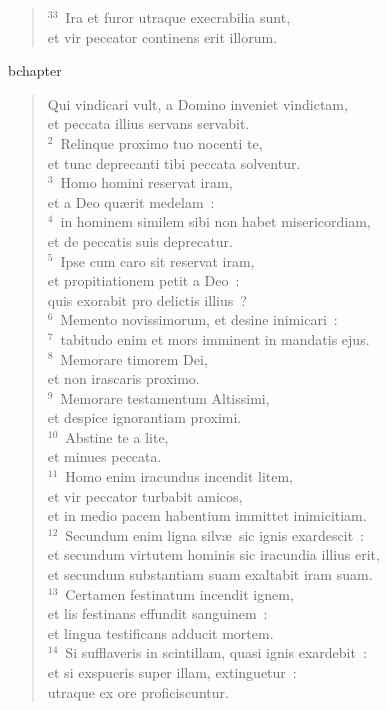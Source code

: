 \begin{verse}${}^{33}$~Ira et furor utraque execrabilia sunt,\\ et vir peccator continens erit illorum.\end{verse}


bchapter\begin{verse}\vspace{-19pt}Qui vindicari vult, a Domino inveniet vindictam,\\ et peccata illius servans servabit.\\
${}^{2}$~Relinque proximo tuo nocenti te,\\ et tunc deprecanti tibi peccata solventur.\\
${}^{3}$~Homo homini reservat iram,\\ et a Deo qu\ae rit medelam~:\\
${}^{4}$~in hominem similem sibi non habet misericordiam,\\ et de peccatis suis deprecatur.\\
${}^{5}$~Ipse cum caro sit reservat iram,\\ et propitiationem petit a Deo~:\\ quis exorabit pro delictis illius~?\\
${}^{6}$~Memento novissimorum, et desine inimicari~:\\
${}^{7}$~tabitudo enim et mors imminent in mandatis ejus.\\
${}^{8}$~Memorare timorem Dei,\\ et non irascaris proximo.\\
${}^{9}$~Memorare testamentum Altissimi,\\ et despice ignorantiam proximi.\\
${}^{10}$~Abstine te a lite,\\ et minues peccata.\\
${}^{11}$~Homo enim iracundus incendit litem,\\ et vir peccator turbabit amicos,\\ et in medio pacem habentium immittet inimicitiam.\\
${}^{12}$~Secundum enim ligna silv\ae\ sic ignis exardescit~:\\ et secundum virtutem hominis sic iracundia illius erit,\\ et secundum substantiam suam exaltabit iram suam.\\
${}^{13}$~Certamen festinatum incendit ignem,\\ et lis festinans effundit sanguinem~:\\ et lingua testificans adducit mortem.\\
${}^{14}$~Si sufflaveris in scintillam, quasi ignis exardebit~:\\ et si exspueris super illam, extinguetur~:\\ utraque ex ore proficiscuntur.\end{verse}



